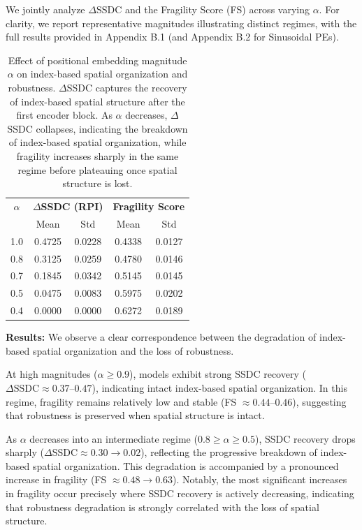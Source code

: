 \documentclass{article}
\begin{document}
    We jointly analyze $\Delta \mathrm{SSDC}$ and the Fragility Score (FS) across varying $\alpha$. For clarity, we report representative magnitudes illustrating distinct regimes, with the full results provided in Appendix B.1 (and Appendix B.2 for Sinusoidal PEs).

    \begin{table}[H]
    \centering
    \small
    \begin{tabular}{c|cc|cc}
    \toprule
    \textbf{$\alpha$} & \multicolumn{2}{c|}{\textbf{$\Delta$SSDC (RPI)}} & \multicolumn{2}{c}{\textbf{Fragility Score}} \\
    & Mean & Std & Mean & Std \\
    \midrule
    1.0 & 0.4725 & 0.0228 & 0.4338 & 0.0127 \\
    0.8 & 0.3125 & 0.0259 & 0.4780 & 0.0146 \\
    0.7 & 0.1845 & 0.0342 & 0.5145 & 0.0145 \\
    0.5 & 0.0475 & 0.0083 & 0.5975 & 0.0202 \\
    0.4 & 0.0000 & 0.0000 & 0.6272 & 0.0189 \\
    \bottomrule
    \end{tabular}
    \caption{
    Effect of positional embedding magnitude $\alpha$ on index-based spatial organization and robustness.
    $\Delta$SSDC captures the recovery of index-based spatial structure after the first encoder block.
    As $\alpha$ decreases, $\Delta$SSDC collapses, indicating the breakdown of index-based spatial organization, while fragility increases sharply in the same regime before plateauing once spatial structure is lost.
    }
    \label{tab:pe_scaling}
    \end{table}

    \textbf{Results:}
    We observe a clear correspondence between the degradation of index-based spatial organization and the loss of robustness.

    At high magnitudes ($\alpha \geq 0.9$), models exhibit strong SSDC recovery ($\Delta \mathrm{SSDC} \approx 0.37$–$0.47$), indicating intact index-based spatial organization. In this regime, fragility remains relatively low and stable (FS $\approx 0.44$–$0.46$), suggesting that robustness is preserved when spatial structure is intact.

    As $\alpha$ decreases into an intermediate regime ($0.8 \geq \alpha \geq 0.5$), SSDC recovery drops sharply ($\Delta \mathrm{SSDC} \approx 0.30 \rightarrow 0.02$), reflecting the progressive breakdown of index-based spatial organization. This degradation is accompanied by a pronounced increase in fragility (FS $\approx 0.48 \rightarrow 0.63$). Notably, the most significant increases in fragility occur precisely where SSDC recovery is actively decreasing, indicating that robustness degradation is strongly correlated with the loss of spatial structure.
\end{document}
